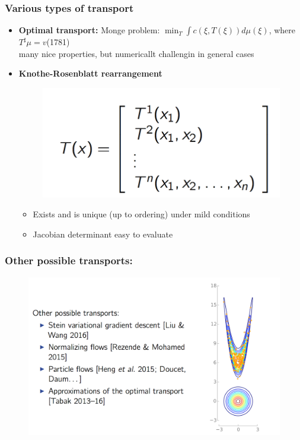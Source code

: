 \documentclass[table]{beamer}
\begin{document}
\begin{CJK}{UTF8}{gbsn}
\begin{frame}
\frametitle{Various types of transport}
\begin{itemize}
\item \textbf{Optimal transport:}
Monge problem: $\min_{T} \int c(\xi,T(\xi)) d \mu (\xi)$, where $T^{\sharp} \mu = v$(1781) \\
many nice properties, but numericallt challengin in general cases
\item \textbf{ Knothe-Rosenblatt rearrangement}
\begin{figure}
\includegraphics[scale=0.2]{img/krrearrangement.png}
\end{figure}
\begin{itemize}
  \item Exists and is unique (up to ordering) under mild conditions
  \item Jacobian determinant easy to evaluate
\end{itemize}
\end{itemize}
\end{frame}
\begin{frame}
\frametitle{Other possible transports:}
\begin{figure}
\includegraphics[scale=0.3]{img/othertransport.png}

\end{figure}
\end{frame}
\end{CJK}
\end{document}
